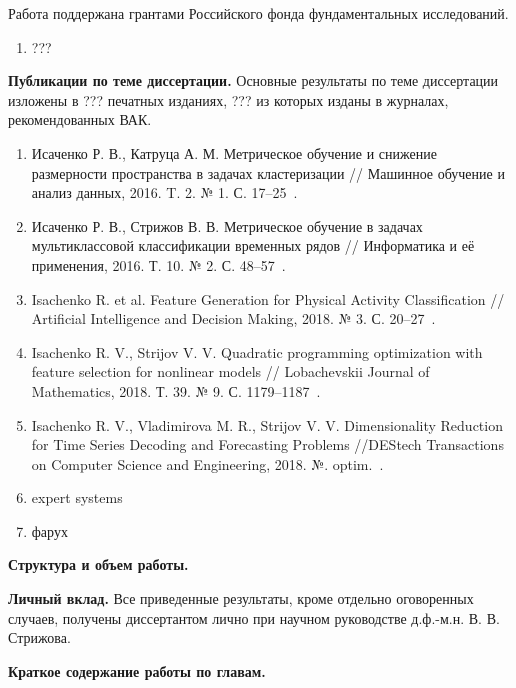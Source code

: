 Работа поддержана грантами Российского фонда фундаментальных исследований.
\begin{enumerate}
	\item {\color{red} ???}
\end{enumerate}

\vspace{0.5cm}
\textbf{Публикации по теме диссертации.}
Основные результаты по теме диссертации изложены в  {\color{red} ???} печатных изданиях, {\color{red} ???} из которых изданы в журналах, рекомендованных ВАК.

\begin{enumerate}
	\item Исаченко Р. В., Катруца А. М. Метрическое обучение и снижение размерности пространства в задачах кластеризации // Машинное обучение и анализ данных, 2016. T. 2. № 1. С. 17--25~\cite{isachenko2016metricjmlda}.
	\item Исаченко Р. В., Стрижов В. В. Метрическое обучение в задачах мультиклассовой классификации временных рядов // Информатика и её применения, 2016. Т. 10. № 2. С. 48--57~\cite{isachenko2016metricia}.
	\item Isachenko R. et al. Feature Generation for Physical Activity Classification // Artificial Intelligence and Decision Making, 2018. № 3. С. 20--27~\cite{isachenko2018feature}.
	\item Isachenko R. V., Strijov V. V. Quadratic programming optimization with feature selection for nonlinear models // Lobachevskii Journal of Mathematics, 2018. Т. 39. № 9. С. 1179--1187~\cite{isachenko2018quadratic}.
	\item Isachenko R. V., Vladimirova M. R., Strijov V. V. Dimensionality Reduction for Time Series Decoding and Forecasting Problems //DEStech Transactions on Computer Science and Engineering, 2018. №. optim.~\cite{isachenko2018plsdestech}.
	\item {\color{red} expert systems}
	\item {\color{red} фарух}
\end{enumerate}

\vspace{0.5cm}
\textbf{Структура и объем работы.}

\vspace{0.5cm}
\textbf{Личный вклад.}
Все приведенные результаты, кроме отдельно оговоренных случаев, получены диссертантом лично при научном руководстве д.ф.-м.н. В. В. Стрижова.

\vspace{0.5cm}
\textbf{Краткое содержание работы по главам.}